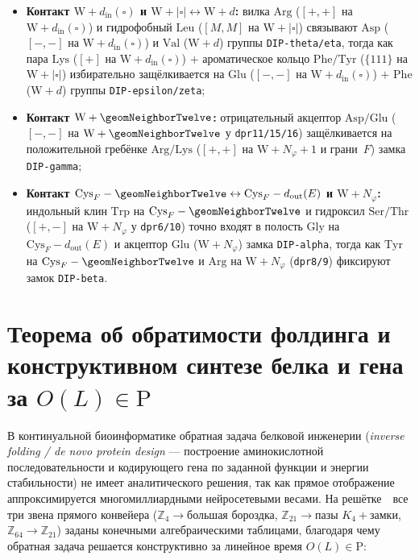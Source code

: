 \begin{itemize}[noitemsep]
\item \textbf{Контакт $\text{W}+d_{\mathrm{in}}(\square)$ и $\text{W}+|\square|\leftrightarrow \text{W}+d$:}
  вилка $\text{Arg}$ ($[+,+]$ на $\text{W}+d_{\mathrm{in}}(\square)$) и гидрофобный $\text{Leu}$ ($[M,M]$ на $\text{W}+|\square|$) связывают $\text{Asp}$ ($[-,-]$ на $\text{W}+d_{\mathrm{in}}(\square)$) и $\text{Val}$ ($\text{W}+d$) группы \texttt{DIP-theta/eta}, тогда как пара $\text{Lys}$ ($[+]$ на $\text{W}+d_{\mathrm{in}}(\square)$) $+$ ароматическое кольцо $\text{Phe/Tyr}$ ($\{111\}$ на $\text{W}+|\square|$) избирательно защёлкивается на $\text{Glu}$ ($[-,-]$ на $\text{W}+d_{\mathrm{in}}(\square)$) $+$ $\text{Phe}$ ($\text{W}+d$) группы \texttt{DIP-epsilon/zeta};
\item \textbf{Контакт $\text{W}+\geomNeighborTwelve$:}
  отрицательный акцептор $\text{Asp/Glu}$ ($[-,-]$ на $\text{W}+\geomNeighborTwelve$ у \texttt{dpr11/15/16}) защёлкивается на положительной гребёнке $\text{Arg/Lys}$ ($[+,+]$ на $\text{W}+N_\varphi+1$ и грани~$F$) замка \texttt{DIP-gamma};
\item \textbf{Контакт $\text{Cys}_F-\geomNeighborTwelve \leftrightarrow \text{Cys}_F-d_{\mathrm{out}}(E)$ и $\text{W}+N_\varphi$:}
  индольный клин $\text{Trp}$ на $\text{Cys}_F-\geomNeighborTwelve$ и гидроксил $\text{Ser/Thr}$ ($[+,-]$ на $\text{W}+N_\varphi$ у \texttt{dpr6/10}) точно входят в полость $\text{Gly}$ на $\text{Cys}_F-d_{\mathrm{out}}(E)$ и акцептор $\text{Glu}$ ($\text{W}+N_\varphi$) замка \texttt{DIP-alpha}, тогда как $\text{Tyr}$ на $\text{Cys}_F-\geomNeighborTwelve$ и $\text{Arg}$ на $\text{W}+N_\varphi$ (\texttt{dpr8/9}) фиксируют замок \texttt{DIP-beta}.
\end{itemize}

\section{Теорема об обратимости фолдинга и конструктивном синтезе белка и гена за \texorpdfstring{$O(L)\in\mathrm{P}$}{O(L) in P}}
\label{sec:bio-constructive-inverse-folding}

В континуальной биоинформатике обратная задача белковой инженерии (\emph{inverse folding / de novo protein design} --- построение аминокислотной последовательности и кодирующего гена по заданной функции и энергии стабильности) не имеет аналитического решения, так как прямое отображение аппроксимируется многомиллиардными нейросетевыми весами.
На решётке~\latGCKshort\ все три звена прямого конвейера ($\mathbb{Z}_4 \to \text{большая бороздка}$, $\mathbb{Z}_{21} \to \text{пазы } K_4 + \text{замки}$, $\mathbb{Z}_{64} \to \mathbb{Z}_{21}$) заданы конечными алгебраическими таблицами, благодаря чему обратная задача решается конструктивно за линейное время $O(L)\in\mathrm{P}$:

